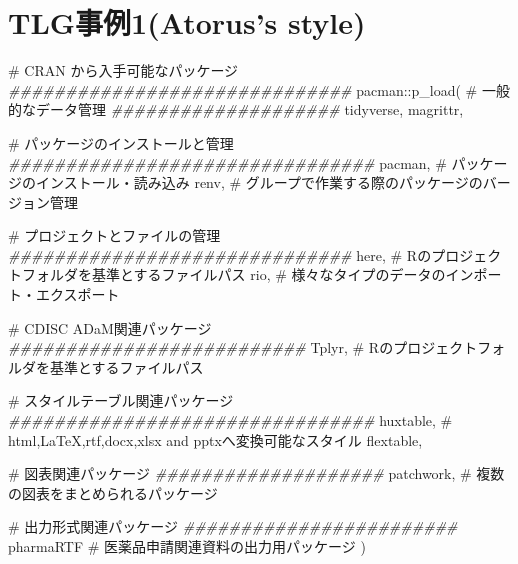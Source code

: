 \documentclass[
  letterpaper,
  DIV=11,
  numbers=noendperiod]{scrreprt}
\newenvironment{Shaded}{\begin{snugshade}}{\end{snugshade}}
\newcommand{\CommentTok}[1]{\textcolor[rgb]{0.37,0.37,0.37}{#1}}
\newcommand{\DocumentationTok}[1]{\textcolor[rgb]{0.37,0.37,0.37}{\textit{#1}}}
\newcommand{\FunctionTok}[1]{\textcolor[rgb]{0.28,0.35,0.67}{#1}}
\newcommand{\NormalTok}[1]{\textcolor[rgb]{0.00,0.23,0.31}{#1}}
\newcommand{\SpecialCharTok}[1]{\textcolor[rgb]{0.37,0.37,0.37}{#1}}
\begin{document}

\hypertarget{tlgux4e8bux4f8b1atoruss-style}{%
\chapter{TLG事例1(Atorus's style)}\label{tlgux4e8bux4f8b1atoruss-style}}

\begin{Shaded}
\begin{Highlighting}[]
\CommentTok{\# CRAN から入手可能なパッケージ}
\DocumentationTok{\#\#\#\#\#\#\#\#\#\#\#\#\#\#\#\#\#\#\#\#\#\#\#\#\#\#\#\#\#\#}
\NormalTok{pacman}\SpecialCharTok{::}\FunctionTok{p\_load}\NormalTok{(}
  \CommentTok{\# 一般的なデータ管理}
  \DocumentationTok{\#\#\#\#\#\#\#\#\#\#\#\#\#\#\#\#\#\#\#\#}
\NormalTok{  tidyverse, }
\NormalTok{  magrittr, }
  
  \CommentTok{\# パッケージのインストールと管理}
  \DocumentationTok{\#\#\#\#\#\#\#\#\#\#\#\#\#\#\#\#\#\#\#\#\#\#\#\#\#\#\#\#\#\#\#\#}
\NormalTok{  pacman,   }\CommentTok{\# パッケージのインストール・読み込み}
\NormalTok{  renv,     }\CommentTok{\# グループで作業する際のパッケージのバージョン管理  }
  
  \CommentTok{\# プロジェクトとファイルの管理}
  \DocumentationTok{\#\#\#\#\#\#\#\#\#\#\#\#\#\#\#\#\#\#\#\#\#\#\#\#\#\#\#\#\#\#}
\NormalTok{  here,     }\CommentTok{\# Rのプロジェクトフォルダを基準とするファイルパス}
\NormalTok{  rio,      }\CommentTok{\# 様々なタイプのデータのインポート・エクスポート}
  
  \CommentTok{\# CDISC ADaM関連パッケージ}
  \DocumentationTok{\#\#\#\#\#\#\#\#\#\#\#\#\#\#\#\#\#\#\#\#\#\#\#\#\#\#}
\NormalTok{  Tplyr,     }\CommentTok{\# Rのプロジェクトフォルダを基準とするファイルパス}

  \CommentTok{\# スタイルテーブル関連パッケージ}
  \DocumentationTok{\#\#\#\#\#\#\#\#\#\#\#\#\#\#\#\#\#\#\#\#\#\#\#\#\#\#\#\#\#\#\#\#}
\NormalTok{  huxtable,  }\CommentTok{\# html,LaTeX,rtf,docx,xlsx and pptxへ変換可能なスタイル}
\NormalTok{  flextable,}
  
  \CommentTok{\# 図表関連パッケージ}
  \DocumentationTok{\#\#\#\#\#\#\#\#\#\#\#\#\#\#\#\#\#\#\#\#}
\NormalTok{  patchwork, }\CommentTok{\# 複数の図表をまとめられるパッケージ}
  
  \CommentTok{\# 出力形式関連パッケージ}
  \DocumentationTok{\#\#\#\#\#\#\#\#\#\#\#\#\#\#\#\#\#\#\#\#\#\#\#\#}
\NormalTok{  pharmaRTF  }\CommentTok{\# 医薬品申請関連資料の出力用パッケージ}
\NormalTok{)}
\end{Highlighting}
\end{Shaded}
\end{document}
